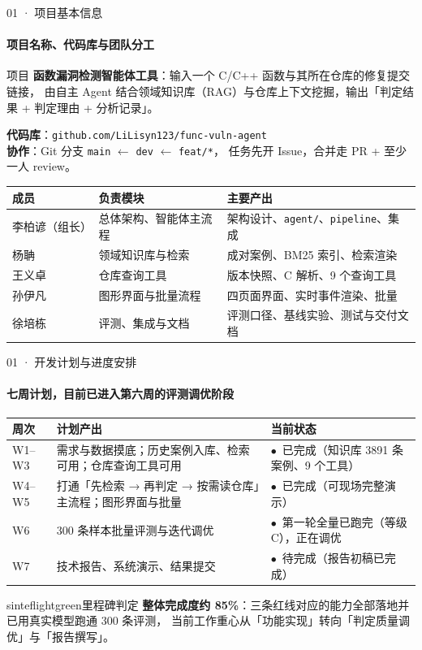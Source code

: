 \documentclass{beamer}
\newcommand{\good}{\textcolor{sintefgreen}{$\bullet$}}
\newcommand{\warn}{\textcolor{sintefyellow}{$\bullet$}}
\newcommand{\bad}{\textcolor{sinteflilla}{$\bullet$}}
\begin{document}
\begin{frame}{01 · 项目基本信息}
\framesubtitle{项目名称、代码库与团队分工}
\small
\begin{block}{项目}
\textbf{函数漏洞检测智能体工具}：输入一个 C/C++ 函数与其所在仓库的修复提交链接，
由自主 Agent 结合领域知识库（RAG）与仓库上下文挖掘，输出「判定结果 + 判定理由 + 分析记录」。
\end{block}

\footnotesize
\textbf{代码库}：\texttt{github.com/LiLisyn123/func-vuln-agent}\\[0.2em]
\textbf{协作}：Git 分支 \texttt{main} $\leftarrow$ \texttt{dev} $\leftarrow$ \texttt{feat/*}，
任务先开 Issue，合并走 PR + 至少一人 review。

\vspace{0.3em}
\scriptsize
\begin{tabular}{@{}p{}p{}p{}@{}}
\toprule
\textbf{成员} & \textbf{负责模块} & \textbf{主要产出} \\
\midrule
李柏谚（组长） & 总体架构、智能体主流程 & 架构设计、\texttt{agent/}、\texttt{pipeline}、集成 \\
杨聃 & 领域知识库与检索 & 成对案例、BM25 索引、检索渲染 \\
王义卓 & 仓库查询工具 & 版本快照、C 解析、9 个查询工具 \\
孙伊凡 & 图形界面与批量流程 & 四页面界面、实时事件渲染、批量 \\
徐培栋 & 评测、集成与文档 & 评测口径、基线实验、测试与交付文档 \\
\bottomrule
\end{tabular}
\end{frame}

\begin{frame}{01 · 开发计划与进度安排}
\framesubtitle{七周计划，目前已进入第六周的评测调优阶段}
\footnotesize
\begin{tabular}{@{}p{}p{}p{}@{}}
\toprule
\textbf{周次} & \textbf{计划产出} & \textbf{当前状态} \\
\midrule
W1--W3 & 需求与数据摸底；历史案例入库、检索可用；仓库查询工具可用
& \good\ 已完成（知识库 3891 条案例、9 个工具） \\
W4--W5 & 打通「先检索 → 再判定 → 按需读仓库」主流程；图形界面与批量
& \good\ 已完成（可现场完整演示） \\
W6 & 300 条样本批量评测与迭代调优
& \warn\ 第一轮全量已跑完（等级 C），正在调优 \\
W7 & 技术报告、系统演示、结果提交
& \bad\ 待完成（报告初稿已完成） \\
\bottomrule
\end{tabular}

\vspace{0.6em}
\begin{colorblock}[black]{sinteflightgreen}{里程碑判定}
\footnotesize
\textbf{整体完成度约 85\%}：三条红线对应的能力全部落地并已用真实模型跑通 300 条评测，
当前工作重心从「功能实现」转向「判定质量调优」与「报告撰写」。
\end{colorblock}
\end{frame}
\end{document}
